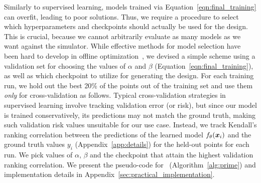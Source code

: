  Similarly to supervised learning, models trained via Equation~\ref{eqn:final_training} can overfit, leading to poor solutions. 
%
Thus, we require a procedure to select which hyperparameters and checkpoints should actually be used for the design.
%
This is crucial, because we cannot arbitrarily evaluate as many models as we want against the simulator.
%
While effective methods for model selection have been hard to develop in offline optimization~\citep{trabucco2021conservative,trabucco2021designbench}, we devised a simple scheme using a validation set for choosing the values of $\alpha$ and $\beta$ (Equation~\ref{eqn:final_training}), as well as which checkpoint to utilize for generating the design.
%
For each training run, we hold out the best 20\% of the points out of the training set and use them \textit{only} for cross-validation as follows.
%
Typical cross-validation strategies in supervised learning involve tracking validation error (or risk), but since our model is trained conservatively, its predictions may not match the ground truth, making such validation risk values unsuitable for our use case.
%
Instead, we track Kendall's ranking correlation between the predictions of the learned model $f_\theta({\boldsymbol{x}}_i)$ and the ground truth values $y_i$ (Appendix~\ref{app:details}) for the held-out points for each run.
%
We pick values of $\alpha$, $\beta$ and the checkpoint that attain the highest validation ranking correlation.
%
We present the pseudo-code for \primemethodname\ (Algorithm~\ref{alg:prime}) and implementation details in Appendix~\ref{sec:practical_implementation}.
